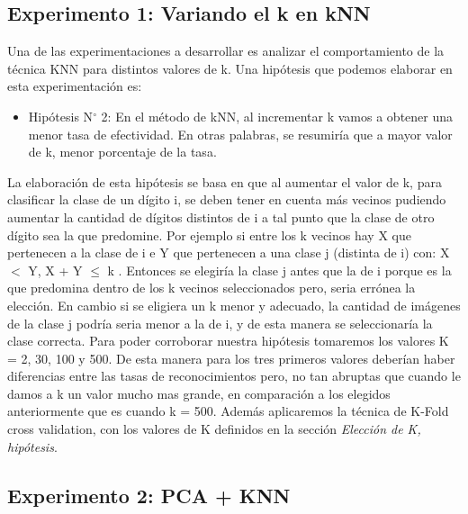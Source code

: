 \subsection{Experimento 1: Variando el k en kNN}
Una de las experimentaciones a desarrollar es analizar el comportamiento de la técnica KNN para distintos valores de k. Una hipótesis que podemos elaborar en esta experimentación es: 
\begin{itemize}
\item Hipótesis N$ ^{\circ} $ 2: En el método de kNN, al incrementar k vamos a obtener una menor tasa de efectividad. En otras palabras, se resumiría que a mayor valor de k, menor porcentaje de la tasa.
\end{itemize}
La elaboración de esta hipótesis se basa en que al aumentar el valor de k, para clasificar la clase de un dígito i, se deben tener en cuenta más vecinos pudiendo aumentar la cantidad de dígitos distintos de i a tal punto que la clase de otro dígito sea la que predomine. Por ejemplo si entre los k vecinos hay X que pertenecen a la clase de i e Y que pertenecen a una clase j (distinta de i) con: \newline
 X $<$ Y, X + Y $\leq$ k .\newline
  Entonces se elegiría la clase j antes que la de i porque es la que predomina dentro de los k vecinos seleccionados pero, seria errónea la elección. En cambio si se eligiera un k menor y adecuado, la cantidad de imágenes de la clase j podría seria menor a la de i, y de esta manera se seleccionaría la clase correcta.
Para poder corroborar nuestra hipótesis tomaremos los valores K = 2, 30, 100 y 500. De esta manera para los tres primeros valores deberían haber diferencias entre las tasas de reconocimientos pero, no tan abruptas que cuando le damos a k un valor mucho mas grande, en comparación a los elegidos anteriormente que es cuando k = 500. Además aplicaremos la técnica de K-Fold cross validation, con los valores de K definidos en la sección  \textit{Elección de K, hipótesis}. 

\subsection{Experimento 2: PCA + KNN}
